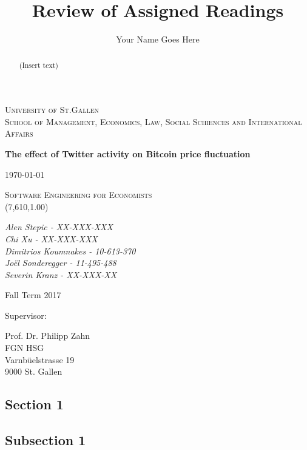 \documentclass[a4paper,american,12pt]{article}
\title{Review of Assigned Readings}
\author{Your Name Goes Here}
\begin{document}
    \begin{titlepage}
        \centering
        {\scshape\LARGE University of St.Gallen \\ \large School of Management, Economics, Law, Social Schiences and International Affairs \par}
        \vspace{2cm}
        {\huge\bfseries The effect of Twitter activity on Bitcoin price fluctuation  \par}
		\vspace{1.5cm}        
        {\large\today\par}
        \vspace{1.5cm}
        {\scshape\Large Software Engineering for Economists \\(7,610,1.00) \par}
        \vspace{1.5cm}
        {\itshape\large Alen Stepic - XX-XXX-XXX \\Chi Xu - XX-XXX-XXX \\Dimitrios Koumnakes - 10-613-370 \\Joël Sonderegger - 11-495-488 \\Severin Kranz - XX-XXX-XX \par}
        
        \begin{spacing}{1}
        \vspace{1cm}
        {Fall Term 2017 \par}
        \vspace{1cm}
        Supervisor:\\
        {Prof. Dr. Philipp Zahn\\ FGN HSG\\ Varnbüelstrasse 19\\ 9000 St. Gallen \par} 
        \end{spacing}
    \end{titlepage}
    
    \begin{abstract}
    \begin{spacing}{1.5}
    
  (Insert text)

    \end{spacing}
    
    \end{abstract}

    \clearpage
    \tableofcontents
    
    \clearpage
    
    \listoffigures
    
    \clearpage

\begin{spacing}{1.2}
\cleardoublepage{}
\section{Section 1}

\subsection{Subsection 1}


\end{spacing}
\clearpage

\printbibliography
\end{document}
